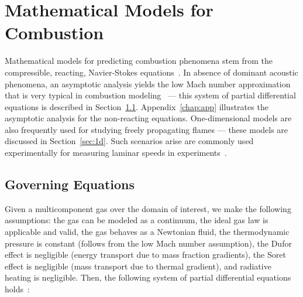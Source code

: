 \chapter{Mathematical Models for Combustion}\label{chap:model}

Mathematical models for predicting combustion phenomena stem from the compressible, reacting, Navier-Stokes equations~\cite{PoinsotVeynante3ed}. In absence
of dominant acoustic phenomena, an asymptotic analysis yields the low Mach number approximation that is very typical in combustion modeling~\cite{Muller,Codina,PoinsotVeynante3ed,Kuo} --- this system of partial differential equations is described in Section~\ref{sec:lowmach}. Appendix~\ref{chap:app}
illustrates the asymptotic analysis for the non-reacting equations. One-dimensional models are
also frequently used for studying freely propagating flames --- these
models are discussed in Section~\ref{sec:1d}. Such
scenarios arise are commonly used experimentally for measuring laminar
speeds in experiments~\cite{Streng}.

\section{Governing Equations}\label{sec:lowmach}

Given a multicomponent gas over the domain of interest, we make the
following assumptions: the gas can be modeled as a continuum, the
ideal gas law is applicable and valid, the gas behaves as a Newtonian
fluid, the thermodynamic pressure
is constant (follows from the low Mach number assumption), the Dufor
effect is negligible (energy transport due to mass fraction gradients),
the Soret effect is negligible (mass transport due to thermal
gradient), and radiative heating is negligible. Then, the following system of partial differential
equations holds~\cite{PoinsotVeynante3ed}:

